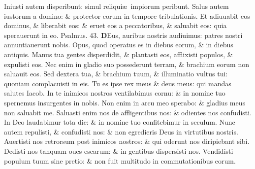 \documentclass[a5paper,10pt]{book}
\def\ae{æ}
\begin{document}
\begin{multicols*}{2}
\newline \color{red} I\color{black}niusti autem disperibunt: simul reliqui\ae \ impiorum peribunt.%
\newline \color{red} S\color{black}alus autem iustorum a domino: \& protector eorum in tempore tribulationis.
\newline \color{red} E\color{black}t adiuuabit eos dominus, \& liberabit eos: \& eruet eos a peccatoribus, \& saluabit eos: quia sperauerunt in eo.
\newline \color{red} Psalmus. \hypertarget{ps43}{43.} \color{black}
\vspace{-1em}
\lettrine[lines=2]{\bfseries \color{red} D}{}Eus, auribus nostris audiuimus: patres nostri annuntiauerunt nobis.
\newline \color{red} O\color{black}pus, quod operatus es in diebus eorum, \& in diebus antiquis.
\newline \color{red} M\color{black}anus tua gentes disperdidit, \& plantasti eos, afflixisti populos, \& expulisti eos.
\newline \color{red} N\color{black}ec enim in gladio suo possederunt terram, \& brachium eorum non saluauit eos.
\newline \color{red} S\color{black}ed dextera tua, \& brachium tuum, \& illuminatio vultus tui: quoniam complacuisti in eis.
\newline \color{red} T\color{black}u es ipse rex meus \& deus meus: qui mandas salutes Iacob.
\newline \color{red} I\color{black}n te inimicos nostros ventilabimus cornu: \& in nomine tuo spernemus insurgentes in nobis.
\newline \color{red} N\color{black}on enim in arcu meo sperabo: \& gladius meus non saluabit me.
\newline \color{red} S\color{black}aluasti enim nos de affligentibus nos: \& odientes nos confudisti.
\newline \color{red} I\color{black}n Deo laudabimur tota die: \& in nomine tuo confitebimur in seculum.
\newline \color{red} N\color{black}unc autem repulisti, \& confudisti nos: \& non egredieris Deus in virtutibus nostris.
\newline \color{red} A\color{black}uertisti nos retrorsum post inimicos nostros: \& qui oderunt nos diripiebant sibi.
\newline \color{red} D\color{black}edisti nos tanquam oues escarum: \& in gentibus dispersisti nos.
\newline \color{red} V\color{black}endidisti populum tuum sine pretio: \& non fuit multitudo in commutationibus eorum.

\end{multicols*}
\end{document}
